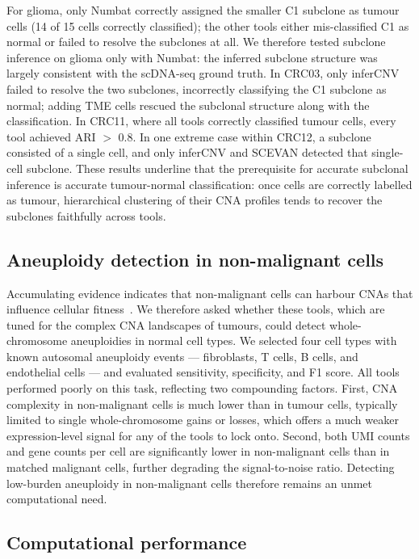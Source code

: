 \documentclass[11pt]{article}
\begin{document}
For glioma, only Numbat correctly assigned the smaller C1 subclone as tumour
cells (14 of 15 cells correctly classified); the other tools either
mis-classified C1 as normal or failed to resolve the subclones at all. We
therefore tested subclone inference on glioma only with Numbat: the
inferred subclone structure was largely consistent with the scDNA-seq ground
truth. In CRC03, only inferCNV failed to resolve the two subclones,
incorrectly classifying the C1 subclone as normal; adding TME cells rescued
the subclonal structure along with the classification. In CRC11, where all
tools correctly classified tumour cells, every tool achieved ARI $>$ 0.8.
In one extreme case within CRC12, a subclone consisted of a single cell, and
only inferCNV and SCEVAN detected that single-cell subclone. These results
underline that the prerequisite for accurate subclonal inference is accurate
tumour-normal classification: once cells are correctly labelled as tumour,
hierarchical clustering of their CNA profiles tends to recover the subclones
faithfully across tools.

\subsection{Aneuploidy detection in non-malignant cells}

Accumulating evidence indicates that non-malignant cells can harbour CNAs
that influence cellular fitness~\cite{zhou2020singlecell}. We therefore
asked whether these tools, which are tuned for the complex CNA landscapes
of tumours, could detect whole-chromosome aneuploidies in normal cell types.
We selected four cell types with known autosomal aneuploidy events ---
fibroblasts, T cells, B cells, and endothelial cells --- and evaluated
sensitivity, specificity, and F1 score. All tools performed poorly on this
task, reflecting two compounding factors. First, CNA complexity in
non-malignant cells is much lower than in tumour cells, typically limited to
single whole-chromosome gains or losses, which offers a much weaker
expression-level signal for any of the tools to lock onto. Second, both UMI
counts and gene counts per cell are significantly lower in non-malignant
cells than in matched malignant cells, further degrading the
signal-to-noise ratio. Detecting low-burden aneuploidy in non-malignant
cells therefore remains an unmet computational need.

\subsection{Computational performance}
\end{document}
